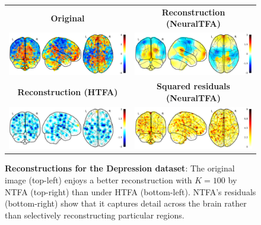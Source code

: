 \documentclass[twoside]{article}
\begin{document}
\begin{figure}[!t]
    \begin{tabular}{cc}
        \textsf{\textbf{Original}} & \textsf{\textbf{Reconstruction (NeuralTFA)}} \\
        \includegraphics[width=\columnwidth]{figures/lepping_2017-399_original_brain.pdf} & \includegraphics[width=\columnwidth]{figures/lepping_2017_trainval-399_ntfa_reconstruction.pdf} \\
        \textsf{\textbf{Reconstruction (HTFA)}} & \textsf{\textbf{Squared residuals (NeuralTFA)}} \\
        \includegraphics[width=\columnwidth]{figures/lepping_2017_trainval-399_htfa_reconstruction.pdf} &\includegraphics[width=\columnwidth]{figures/lepping_2017_trainval-399_ntfa_reconstruction_diff.pdf}
    \end{tabular}
    \caption{\textbf{Reconstructions for the Depression dataset}: The original image (top-left) enjoys a better reconstruction with $K=100$ by NTFA (top-right) than under HTFA (bottom-left).  NTFA's residuals (bottom-right) show that it captures detail across the brain rather than selectively reconstructing particular regions.}
    \label{fig:lepping-reconstruction}
\end{figure}
\end{document}
